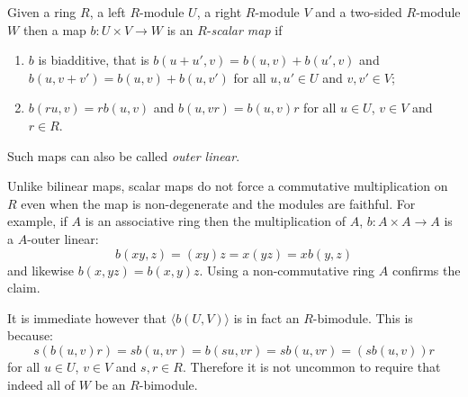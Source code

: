 \documentclass[12pt]{article}
\begin{document}
Given a ring $R$, a left $R$-module $U$, a right $R$-module $V$ and a two-sided 
$R$-module $W$
then a map $b:U\times V\to W$ is an $R$-\emph{scalar map} if
\begin{enumerate}
\item $b$ is biadditive, that is $b(u+u',v)=b(u,v)+b(u',v)$ and $b(u,v+v')=b(u,v)+b(u,v')$
for all $u,u'\in U$ and $v,v'\in V$;
\item $b(ru,v)=rb(u,v)$ and $b(u,vr)=b(u,v)r$ for all $u\in U$, $v\in V$ and $r\in R$.
\end{enumerate}

Such maps can also be called \emph{outer linear}.

Unlike bilinear maps, scalar maps do not force a commutative multiplication 
on $R$ even when the map is non-degenerate and the modules are faithful.
For example, if $A$ is an associative ring then the multiplication of $A$,
$b:A\times A\to A$ is a $A$-outer linear:
\[b(xy,z)=(xy)z=x(yz)=xb(y,z)\]
and likewise $b(x,yz)=b(x,y)z$.  Using a non-commutative ring $A$ confirms 
the claim.

It is immediate however that $\langle b(U,V)\rangle$ is in fact an $R$-bimodule.  
This is because:
\[s(b(u,v)r)=sb(u,vr)=b(su,vr)=sb(u,vr)=(sb(u,v))r\]
for all $u\in U$, $v\in V$ and $s,r\in R$.  Therefore it is not uncommon to
require that indeed all of $W$ be an $R$-bimodule.
\end{document}
